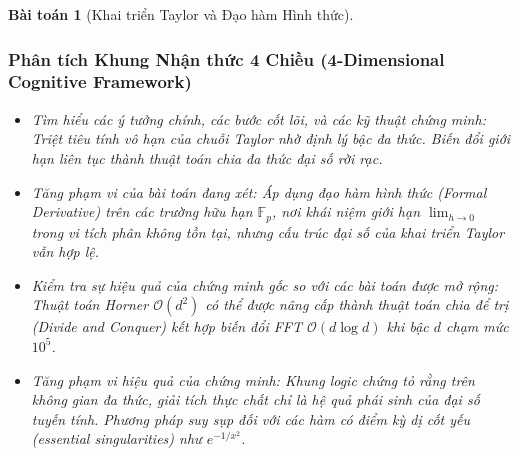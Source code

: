 \documentclass{article}
\newtheorem{baitoan}{Bài toán}
\begin{document}
\begin{baitoan}[Khai triển Taylor và Đạo hàm Hình thức]
 \subsubsection*{Phân tích Khung Nhận thức 4 Chiều (4-Dimensional Cognitive Framework)}
 \begin{itemize}
 \item \textit{Tìm hiểu các ý tưởng chính, các bước cốt lõi, và các kỹ thuật chứng minh}: Triệt tiêu tính vô hạn của chuỗi Taylor nhờ định lý bậc đa thức. Biến đổi giới hạn liên tục thành thuật toán chia đa thức đại số rời rạc.
 \item \textit{Tăng phạm vi của bài toán đang xét}: Áp dụng đạo hàm hình thức (Formal Derivative) trên các trường hữu hạn $\mathbb{F}_p$, nơi khái niệm giới hạn $\lim_{h\to 0}$ trong vi tích phân không tồn tại, nhưng cấu trúc đại số của khai triển Taylor vẫn hợp lệ.
 \item \textit{Kiểm tra sự hiệu quả của chứng minh gốc so với các bài toán được mở rộng}: Thuật toán Horner $\mathcal{O}(d^2)$ có thể được nâng cấp thành thuật toán chia để trị (Divide and Conquer) kết hợp biến đổi FFT $\mathcal{O}(d \log d)$ khi bậc $d$ chạm mức $10^5$.
 \item \textit{Tăng phạm vi hiệu quả của chứng minh}: Khung logic chứng tỏ rằng trên không gian đa thức, giải tích thực chất chỉ là hệ quả phái sinh của đại số tuyến tính. Phương pháp suy sụp đối với các hàm có điểm kỳ dị cốt yếu (essential singularities) như $e^{-1/x^2}$.
 \end{itemize}
\end{baitoan}

\end{document}
